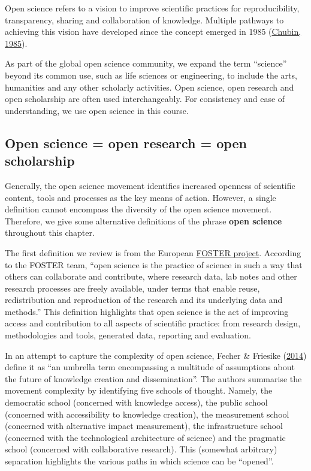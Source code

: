 \documentclass[
]{book}
\begin{document}
Open science refers to a vision to improve scientific practices for reproducibility, transparency, sharing and collaboration of knowledge. Multiple pathways to achieving this vision have developed since the concept emerged in 1985 (\href{https://journals.sagepub.com/doi/10.1177/016224398501000211}{Chubin, 1985}).

As part of the global open science community, we expand the term ``science'' beyond its common use, such as life sciences or engineering, to include the arts, humanities and any other scholarly activities. Open science, open research and open scholarship are often used interchangeably. For consistency and ease of understanding, we use open science in this course.

\hypertarget{open-science-open-research-open-scholarship}{%
\subsection{Open science = open research = open scholarship}\label{open-science-open-research-open-scholarship}}

Generally, the open science movement identifies increased openness of scientific content, tools and processes as the key means of action. However, a single definition cannot encompass the diversity of the open science movement. Therefore, we give some alternative definitions of the phrase \textbf{open science} throughout this chapter.

The first definition we review is from the European \href{https://www.fosteropenscience.eu/}{FOSTER project}. According to the FOSTER team, ``open science is the practice of science in such a way that others can collaborate and contribute, where research data, lab notes and other research processes are freely available, under terms that enable reuse, redistribution and reproduction of the research and its underlying data and methods.'' This definition highlights that open science is the act of improving access and contribution to all aspects of scientific practice: from research design, methodologies and tools, generated data, reporting and evaluation.

In an attempt to capture the complexity of open science, Fecher \& Friesike (\href{https://www.researchgate.net/publication/236607487_Open_Science_One_Term_Five_Schools_of_Thought}{2014}) define it as ``an umbrella term encompassing a multitude of assumptions about the future of knowledge creation and dissemination''. The authors summarise the movement complexity by identifying five schools of thought. Namely, the democratic school (concerned with knowledge access), the public school (concerned with accessibility to knowledge creation), the measurement school (concerned with alternative impact measurement), the infrastructure school (concerned with the technological architecture of science) and the pragmatic school (concerned with collaborative research). This (somewhat arbitrary) separation highlights the various paths in which science can be ``opened''.
\end{document}
